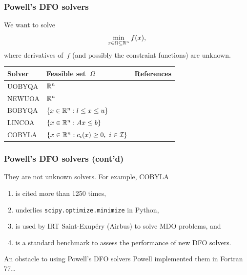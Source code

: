\documentclass{polyu-presentation}
\newcommand{\con}[1][]{c\ifthenelse{\equal{#1}{}}{}{_{#1}}}
\newcommand{\fset}{\Omega}
\newcommand{\iub}{\mathcal{I}}
\newcommand{\iter}[1][]{x\ifthenelse{\equal{#1}{}}{}{^{#1}}}
\newcommand{\obj}{f}
\newcommand{\xl}{l}
\newcommand{\xu}{u}
\begin{document}
\begin{frame}
    \frametitle{Powell's DFO solvers}

    We want to solve
    \begin{equation*}
        \min_{\iter \in \fset \subseteq \R^n} \obj(\iter),
    \end{equation*}
    where derivatives of~$\obj$ (and possibly the constraint functions) are \alert{unknown}.

    \bigskip

    \begin{center}
        \begin{tabular}{@{}lll@{}}
            \toprule
            Solver  & Feasible set~$\Omega$                                 & References\\
            \midrule
            UOBYQA  & $\mathbb{R}^n$                                                & \textcite{Powell_2002}\\
            NEWUOA  & $\mathbb{R}^n$                                                & \textcite{Powell_2006}\\
            BOBYQA  & $\set{x \in \R^n : \xl \le x \le \xu}$                & \textcite{Powell_2009}\\
            LINCOA  & $\{x \in \mathbb{R}^n : A x \le b\}$                        & \textcite{Powell_2015}\\
            COBYLA  & $\set{x \in \R^n : \con[i](x) \ge 0, ~ i \in \iub}$   & \textcite{Powell_1994}\\
            \bottomrule
        \end{tabular}
    \end{center}
\end{frame}

\begin{frame}
    \frametitle{Powell's DFO solvers (cont'd)}

    They are \alert{not} unknown solvers.
    For example, COBYLA
    \begin{enumerate}
        \item is cited more than \alert{\num{1250} times},
        \item underlies \texttt{scipy.optimize.minimize} in Python,
        \item is used by IRT Saint-Exup{\'{e}}ry (\alert{Airbus}) to solve MDO problems, and
        \item is a standard benchmark to assess the performance of new DFO solvers.
    \end{enumerate}

    \bigskip

    \begin{block}{An obstacle to using Powell's DFO solvers}
        Powell implemented them in \alert{Fortran 77}\dots
    \end{block}
\end{frame}
\end{document}

